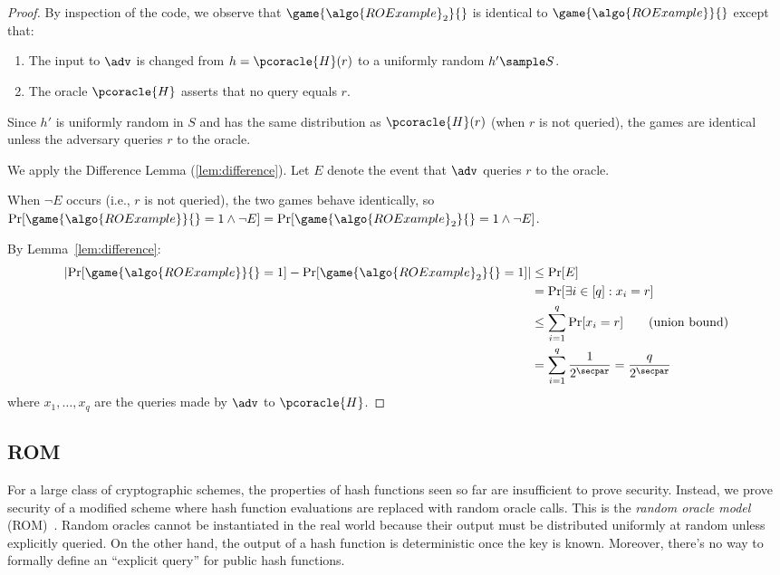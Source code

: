 \begin{proof}
  By inspection of the code, we observe that $\game{\algo{ROExample}_2}{}$ is identical to $\game{\algo{ROExample}}{}$ except that:
  \begin{enumerate}
  \item The input to $\adv$ is changed from $h = \pcoracle{H}(r)$ to a uniformly random $h' \sample S$.
  \item The oracle $\pcoracle{H}$ asserts that no query equals $r$.
  \end{enumerate}
  
  Since $h'$ is uniformly random in $S$ and has the same distribution as $\pcoracle{H}(r)$ (when $r$ is not queried), the games are identical unless the adversary queries $r$ to the oracle.
  
  We apply the Difference Lemma (\autoref{lem:difference}).
  Let $E$ denote the event that $\adv$ queries $r$ to the oracle.
  
  When $\neg E$ occurs (i.e., $r$ is not queried), the two games behave identically, so $\Pr[\game{\algo{ROExample}}{} = 1 \wedge \neg E] = \Pr[\game{\algo{ROExample}_2}{} = 1 \wedge \neg E]$. 
  
  By Lemma~\ref{lem:difference}:
  \begin{align*}
    \left|\Pr[\game{\algo{ROExample}}{} = 1] - \Pr[\game{\algo{ROExample}_2}{} = 1]\right| &\leq \Pr[E] \\
    &= \Pr[\exists i \in [q] : x_i = r] \\
    &\leq \sum_{i=1}^q \Pr[x_i = r] \tag{union bound} \\
    &= \sum_{i=1}^q \frac{1}{2^\secpar} = \frac{q}{2^\secpar}
  \end{align*}
  where $x_1, \ldots, x_q$ are the queries made by $\adv$ to $\pcoracle{H}$.
\end{proof}

\subsection{ROM}

  For a large class of cryptographic schemes, the properties of hash functions seen so far are insufficient to prove security.
  Instead, we prove security of a modified scheme where hash function evaluations are replaced with random oracle calls.
  This is the \emph{random oracle model} (ROM)~\cite{CCS:BelRog93}.
  Random oracles cannot be instantiated in the real world because their output must be distributed uniformly at random unless explicitly queried.
  On the other hand, the output of a hash function is deterministic once the key is known.
  Moreover, there's no way to formally define an ``explicit query'' for public hash functions.

